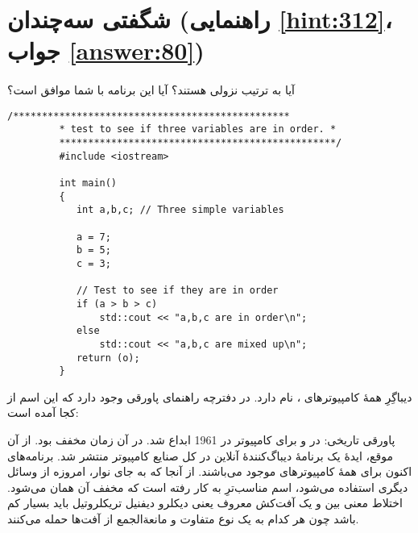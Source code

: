 \section[شگفتی سه‌چندان]{شگفتی سه‌چندان \protect{} (راهنمایی \ref{hint:312}، جواب \ref{answer:80})}
\paragraph{}\label{prog:45}
آیا  به ترتیب نزولی هستند؟ آیا این برنامه با شما موافق است؟

\begin{LTR}
    \begin{lstlisting}[style=C++Style]
         /************************************************
         * test to see if three variables are in order. *
         ************************************************/
         #include <iostream>

         int main()
         {
         	int a,b,c; // Three simple variables

         	a = 7;
         	b = 5;
         	c = 3;

         	// Test to see if they are in order
         	if (a > b > c)
         		std::cout << "a,b,c are in order\n";
         	else
         		std::cout << "a,b,c are mixed up\n";
         	return (o);
         }
    \end{lstlisting}
\end{LTR}

\begin{tcolorbox}
    دیباگِرِ همهٔ کامپیوترهای ،  نام دارد. در دفترچه راهنمای  پاورقی وجود دارد که این اسم از کجا آمده است:

    پاورقی تاریخی:  در  و برای کامپیوتر  در 1961 ابداع شد. در آن زمان  مخفف  بود. از آن موقع، ایدهٔ یک برنامهٔ دیباگ‌کنندهٔ آنلاین در کل صنایع کامپیوتر منتشر شد. برنامه‌های  اکنون برای همهٔ کامپیوترهای  موجود می‌باشند. از آنجا که به جای نوار، امروزه از وسائل دیگری استفاده می‌شود، اسم مناسب‌ترِ  به کار رفته است که مخفف آن همان  می‌شود. اختلاط معنی بین  و یک آفت‌کش معروف یعنی دیکلرو دیفنیل تریکلروتیل  باید بسیار کم باشد چون هر کدام به یک نوع متفاوت و مانعة‌الجمع از آفت‌ها حمله می‌کنند.
\end{tcolorbox}